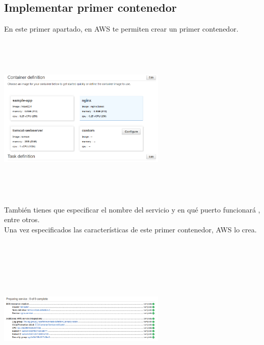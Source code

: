 \documentclass[english,runningheads,a4paper]{llncs}[2018/03/10]
\newenvironment{nscenter}
 {\parskip=0pt\par\nopagebreak\centering}
 {\par\noindent\ignorespacesafterend}
\begin{document}
\subsection*{Implementar primer contenedor}
En este primer apartado, en AWS te permiten crear un primer contenedor.
\newline
\begin{nscenter}
\includegraphics[width=8cm,height=8cm,keepaspectratio]{./Contenedores/AWS/18.png}
\end{nscenter}
\newline
También tienes que especificar el nombre del servicio y en qué puerto funcionará
, entre otros.\\ Una vez especificados las características de este primer 
contenedor, AWS lo crea.
\newline
\begin{nscenter}
\includegraphics[width=8cm,height=8cm,keepaspectratio]{./Contenedores/AWS/19.png}
\end{nscenter}
\newline
\end{document}
